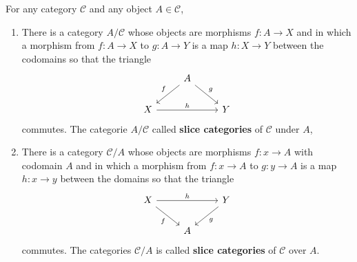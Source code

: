 \documentclass[12pt, oneside]{book}
\begin{document}
\begin{definition}
    For any category $\mathcal{C}$ and any object $A \in \mathcal{C}$,
    \begin{enumerate}
        \item
              There is a category $A / \mathcal{C}$ whose objects are morphisms $f: A \rightarrow X$ and in which a morphism from $f: A\rightarrow X$ to $g: A \rightarrow Y$ is a map $h: X \rightarrow Y$ between the codomains so that the triangle
              \begin{equation*}
                  \begin{tikzcd}
                      & \arrow[ld,"f"'] A\arrow[rd," g"]& \\
                      X\arrow[rr,"h"]& & Y
                  \end{tikzcd}
              \end{equation*}
              commutes.
              The categorie $A / \mathcal{C}$ called \textbf{slice categories} of $\mathcal{C}$ under $A$,

        \item
              There is a category $\mathcal{C} / A$ whose objects are morphisms $f: x \rightarrow A$ with codomain $A$ and in which a morphism from $f: x \rightarrow A$ to $g: y \rightarrow A$ is a map $h: x \rightarrow y$ between the domains so that the triangle
              \begin{equation*}
                  \begin{tikzcd}
                      X\arrow[rd,"f"'] \arrow[rr,"h"]& & \arrow[ld,"g"] Y\\
                      & A &
                  \end{tikzcd}
              \end{equation*}
              commutes.
              The categories $\mathcal{C} / A$ is called \textbf{slice categories} of $\mathcal{C}$ over $A$.
    \end{enumerate}
\end{definition}
\end{document}
